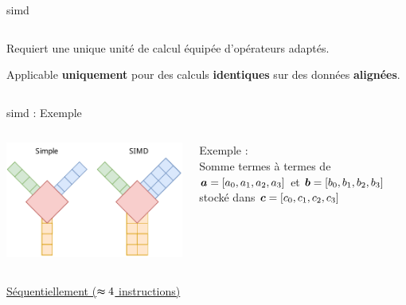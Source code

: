 \documentclass[../main.tex]{subfiles}
\begin{document}
\begin{frame}{\acrfull{simd}}
\begin{columns}
\begin{column}{.7\linewidth}
      \vspace{2 em}

      \begin{ctrlitemize}{.5 em}
        \item Requiert une unique unité de calcul équipée d'opérateurs adaptés.
        \item Applicable \textbf{uniquement} pour des calculs \textbf{identiques} sur des données \textbf{alignées}.
      \end{ctrlitemize}
    \end{column}
  \end{columns}
\end{frame}


\begin{frame}[fragile]{\acrshort{simd} : Exemple}
  \vspace{- 1 em}
  \begin{columns}
    \begin{column}{.5\linewidth}
      \centering
      \includegraphics[height=.35\textheight]{figures/drawiopdf/testyolo-jm2.pdf}
    \end{column}
    \begin{column}{.5\linewidth}
      Exemple : \\
      \hspace{2 em} \centering Somme termes à termes de $\bm{a} = [a_0, a_1, a_2, a_3]$ et $\bm{b} = [b_0, b_1, b_2, b_3]$ stocké dans $\bm{c} =  [c_0, c_1, c_2, c_3]$
    \end{column}
  \end{columns} \vspace{1 em}

  \begin{columns}
    \begin{column}{.5\linewidth}
      \begin{overlayarea}{\linewidth}{.4\textheight}
        \underline{Séquentiellement ($\thickapprox 4$ instructions)} \vspace{1 em}


\end{overlayarea}
\end{column}
\end{columns}
\end{frame}
\end{document}
